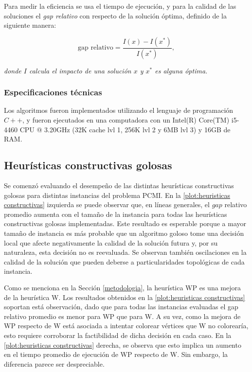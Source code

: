 Para medir la eficiencia se usa el tiempo de ejecución, y para la calidad de las soluciones el \textit{gap relativo} con respecto de la solución óptima, definido de la siguiente manera:

$$\text{gap relativo} = \frac{I(x) - I(x^*)}{I(x^*)},$$

\textit{donde $I$ calcula el impacto de una solución $x$ y $x^*$ es alguna óptima.}

\subsubsection{Especificaciones técnicas}

Los algoritmos fueron implementados utilizando el lenguaje de programación $C++$, y fueron ejecutados en una computadora con un Intel(R) Core(TM) i5-4460 CPU @ 3.20GHz (32K cache lvl 1, 256K lvl 2 y 6MB lvl 3) y 16GB de RAM.

\subsection{Heurísticas constructivas golosas}

Se comenzó evaluando el desempeño de las distintas heurísticas constructivas golosas para distintas instancias del problema PCMI. En la \cref{plot:heuristicas constructivas} izquierda se puede observar que, en líneas generales, el $gap$ relativo promedio aumenta con el tamaño de la instancia para todas las heurísticas constructivas golosas implementadas. Este resultado es esperable porque a mayor tamaño de instancia es más probable que un algoritmo goloso tome una decisión local que afecte negativamente la calidad de la solución futura y, por su naturaleza, esta decisión no es reevaluada. Se observan también oscilaciones en la calidad de la solución que pueden deberse a particularidades topológicas de cada instancia.

Como se menciona en la Sección \ref{metodologia}, la heurística WP es una mejora de la heurística W. Los resultados obtenidos en la \cref{plot:heuristicas constructivas} soportan está observación, dado que para todas las instancias evaluadas el gap relativo promedio es menor para WP que para W. A su vez, como la mejora de WP respecto de W está asociada a intentar colorear vértices que W no colorearía, esto requiere corroborar la factibilidad de dicha decisión en cada caso. En la \cref{plot:heuristicas constructivas} derecha, se observa que esto implica un aumento en el tiempo promedio de ejecución de WP respecto de W. Sin embargo, la diferencia parece ser despreciable.


